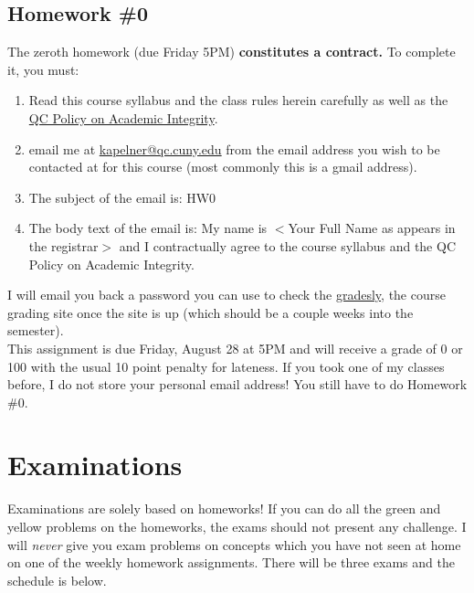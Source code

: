 \documentclass[12pt]{article}
\newcommand{\inred}[1]{\color{red}\textbf{#1} \color{black}}
\newcommand{\qu}[1]{``#1''}
\begin{document}
\subsection*{Homework \#0}

The zeroth homework (due Friday 5PM) \inred{constitutes a contract.} To complete it, you must:

\begin{enumerate}[(1)]
\item Read this course syllabus and the class rules herein carefully as well as the \href{https://www.qc.cuny.edu/StudentLife/services/studev/Documents/Academic%20Integrity%20Violation%20Form%20RV.pdf}{QC Policy on Academic Integrity}.
\item email me at \href{kapelner@qc.cuny.edu}{kapelner@qc.cuny.edu} from the email address you wish to be contacted at for this course (most commonly this is a gmail address).
\item The subject of the email is: HW0
\item The body text of the email is: My name is $<$Your Full Name as appears in the registrar$>$ and I contractually agree to the course syllabus and the QC Policy on Academic Integrity.
\end{enumerate}


I will email you back a password you can use to check the \href{http://gradesly.com}{gradesly}, the course grading site once the site is up (which should be a couple weeks into the semester). \\

This assignment is due Friday, August 28 at 5PM and will receive a grade of 0 or 100 with the usual 10 point penalty for lateness. If you took one of my classes before, I do not store your personal email address! You still have to do Homework \#0.


\section*{Examinations}

Examinations are solely based on homeworks! If you can do all the green and yellow problems on the homeworks, the exams should not present any challenge. I will \textit{never} give you exam problems on concepts which you have not seen at home on one of the weekly homework assignments. There will be three exams and the schedule is below.
\end{document}
